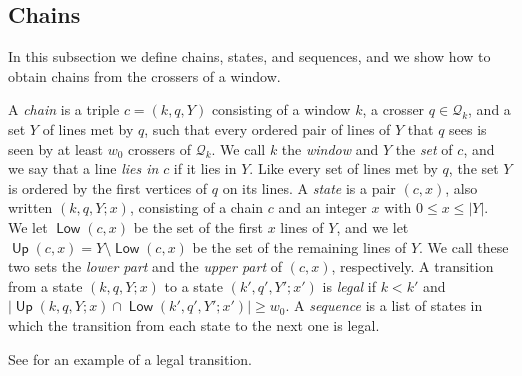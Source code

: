 \documentclass[fontsize=12pt,leading=14pt]{fullpaper}
\DeclareMathOperator{\up}{\mathsf{Up}}
\DeclareMathOperator{\dn}{\mathsf{Low}}
\newcommand{\Qcal}{\mathcal{Q}}
\begin{document}
\subsection{Chains}\label{sec:chains-def}

In this subsection we define chains, states, and sequences, and we show how to obtain chains from the crossers of a window.

\begin{definition}\label{def:chain}
  A \emph{chain} is a triple $c=(k,q,Y)$ consisting of a window $k$, a crosser $q\in\Qcal_k$, and a set $Y$ of lines met by $q$, such that every ordered pair of lines of $Y$ that $q$ sees is seen by at least $w_0$ crossers of $\Qcal_k$.
  We call $k$ the \emph{window} and $Y$ the \emph{set} of $c$, and we say that a line \emph{lies in} $c$ if it lies in $Y$.
  Like every set of lines met by $q$, the set $Y$ is ordered by the first vertices of $q$ on its lines.
  A \emph{state} is a pair $(c,x)$, also written $(k,q,Y;x)$, consisting of a chain $c$ and an integer $x$ with $0\le x\le|Y|$.
  We let $\dn(c,x)$ be the set of the first $x$ lines of $Y$, and we let $\up(c,x)=Y\setminus\dn(c,x)$ be the set of the remaining lines of $Y$.
  We call these two sets the \emph{lower part} and the \emph{upper part} of $(c,x)$, respectively.
  A transition from a state $(k,q,Y;x)$ to a state $(k',q',Y';x')$ is \emph{legal} if $k<k'$ and $|\up(k,q,Y;x)\cap\dn(k',q',Y';x')|\ge w_0$.
  A \emph{sequence} is a list of states in which the transition from each state to the next one is legal.
\end{definition}

See  for an example of a legal transition.
\end{document}
